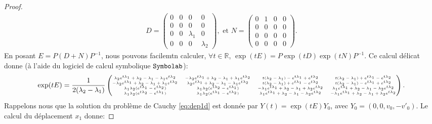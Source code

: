 \begin{proof}
\begin{align*}
    D = \begin{pmatrix}
        0 & 0 & 0 & 0 \\ 0 & 0 & 0 & 0 \\ 0 & 0 & \lambda_1 & 0 \\ 0 & 0 & 0 & \lambda_2
    \end{pmatrix}, \text{ et } N = \begin{pmatrix}
        0 & 1 & 0 & 0 \\ 0 & 0 & 0 & 0 \\ 0 & 0 & 0 & 0 \\ 0 & 0 & 0 & 0
    \end{pmatrix}.
\end{align*}
En posant $E = P(D+N)P^{-1}$, nous pouvons facilemtn calculer, $\forall t \in \mathbb{R}$, $\exp(tE) = P\exp(tD)\exp(tN)P^{-1}$. Ce calcul délicat donne (à l'aide du logiciel de calcul symbolique $\verb|Symbolab|$):
\begin{align*}
    \exp(tE) = \tiny \frac{1}{2(\lambda_2 - \lambda_1)}\begin{pmatrix} 
        \lambda_2e^{t\lambda_1} + \lambda_2 - \lambda_1 - \lambda_1e^{t\lambda_2} & -\lambda_2e^{t\lambda_1} + \lambda_2 - \lambda_1 + \lambda_1e^{t\lambda_2} & t(\lambda_2 -\lambda_1) - e^{t\lambda_1} + e^{t\lambda_2} & t(\lambda_2 -\lambda_1) + e^{t\lambda_1} - e^{t\lambda_2} \\
         -\lambda_2e^{t\lambda_1} + \lambda_2 - \lambda_1 + \lambda_1e^{t\lambda_2} & \lambda_2e^{t\lambda_1} + \lambda_2 - \lambda_1 - \lambda_1e^{t\lambda_2} & t(\lambda_2 -\lambda_1) + e^{t\lambda_1} - e^{t\lambda_2} & t(\lambda_2 -\lambda_1) - e^{t\lambda_1} + e^{t\lambda_2} \\
          \lambda_1\lambda_2 (e^{t\lambda_1} - e^{t\lambda_2}) & \lambda_1\lambda_2 (e^{t\lambda_2} - e^{t\lambda_1})  & -\lambda_1e^{t\lambda_1} + \lambda_2 - \lambda_1 + \lambda_2e^{t\lambda_2} & \lambda_1e^{t\lambda_1} + \lambda_2 - \lambda_1 - \lambda_2e^{t\lambda_2} \\
          \lambda_1\lambda_2 (e^{t\lambda_2} - e^{t\lambda_1})  & \lambda_1\lambda_2 (e^{t\lambda_1} - e^{t\lambda_2})  & \lambda_1e^{t\lambda_1} + \lambda_2 - \lambda_1 - \lambda_2e^{t\lambda_2} & -\lambda_1e^{t\lambda_1} + \lambda_2 - \lambda_1 + \lambda_2e^{t\lambda_2}
    \end{pmatrix}.
\end{align*}
Rappelons nous que la solution du problème de Cauchy \cref{eq:dep1d} est donnée par $Y(t) = \exp(tE)Y_0$, avec $Y_0 = (0,0,v_0,-v'_0)$. Le calcul du déplacement $x_1$ donne:

\end{proof}

